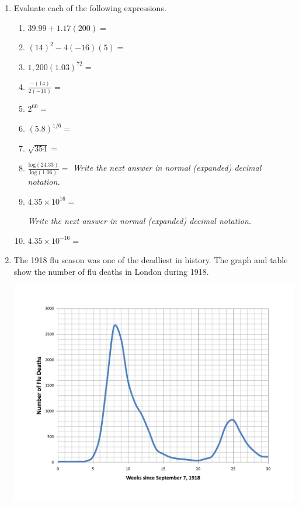 \documentclass[12pt]{article}
\begin{document}
  \vspace{.2in}
 
 \hrulefill
 
\newpage  %

\begin{enumerate}
\item Evaluate each of the following expressions.

\begin{enumerate}
\item $39.99 + 1.17(200)=$
\vfill
\item $(14)^2-4(-16)(5)=$
\vfill
\item $1,200(1.03)^{72}=$
\vfill
\item $\displaystyle \frac{-(14)}{2(-16)}=$
\vfill
\item $2^{60}=$
\vfill
\item $(5.8)^{1/6}=$
\vfill
\item $\sqrt{354}=$
\vfill
\item $\displaystyle \frac{\text{log}(24.33)}{\text{log}(1.06)}=$
\vfill
\emph{Write the next answer in normal (expanded) decimal notation.}
\item $4.35 \times 10^{16}=$  


\vfill
\emph{Write the next answer in normal (expanded) decimal notation.}
\item $4.35 \times 10^{-16}=$  


\vfill
\end{enumerate}

\newpage  %

\item The 1918 flu season was one of the deadliest in history.  The graph and table show the number of flu deaths in London during 1918.

\begin{center}
\includegraphics [width = .7\textwidth] {LondonFlu.pdf}
\end{center}


\end{enumerate}
\end{document}
